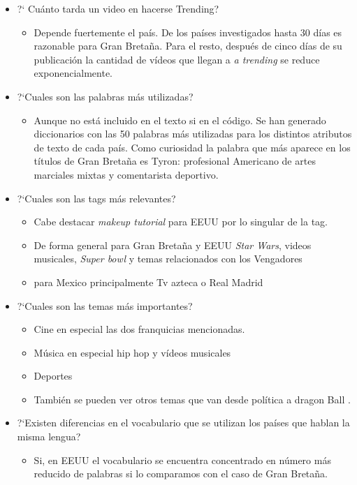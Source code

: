\documentclass[a4paper,12pt]{article}
\begin{document}
\begin{itemize}
\item ?` Cu\'anto tarda un video en hacerse Trending?
\begin{itemize}
\item Depende fuertemente el pa\'is. De los pa\'ises investigados hasta 30 d\'ias es razonable para Gran Breta\~na. Para el resto, despu\'es de cinco d\'ias de su publicaci\'on la cantidad de v\'ideos que llegan a {\itshape a trending} se reduce exponencialmente.
\end{itemize}
\item ?`Cuales son las palabras m\'as utilizadas?
\begin{itemize}
\item Aunque no est\'a incluido en el texto si en el c\'odigo. Se han generado diccionarios con las 50 palabras m\'as utilizadas para los distintos atributos de texto de cada pa\'is. Como curiosidad la palabra que m\'as aparece en los t\'itulos de Gran Breta\~na es Tyron: profesional Americano de artes marciales mixtas y comentarista deportivo.
\end{itemize}
\item ?`Cuales son las tags m\'as relevantes?
\begin{itemize}
\item Cabe destacar {\itshape makeup tutorial} para EEUU por lo singular de la tag.
\item De forma general para Gran Breta\~na y EEUU {\itshape Star Wars}, videos musicales, {\itshape Super bowl} y temas relacionados con los Vengadores
\item para Mexico principalmente Tv azteca o Real Madrid  
\end{itemize}
\item ?`Cuales son las temas m\'as importantes?
\begin{itemize}
\item Cine en especial las dos franquicias mencionadas.
\item M\'usica en especial hip hop y v\'ideos musicales
\item Deportes
\item Tambi\'en se pueden ver otros temas que van desde pol\'itica a dragon Ball .
\end{itemize}
\item ?`Existen diferencias en el vocabulario que se utilizan los pa\'ises que hablan la misma lengua?
\begin{itemize}
\item Si, en EEUU el vocabulario se encuentra concentrado en n\'umero m\'as reducido de palabras si lo comparamos con el caso de Gran Breta\~na.
\end{itemize}


\end{itemize}
\end{document}
